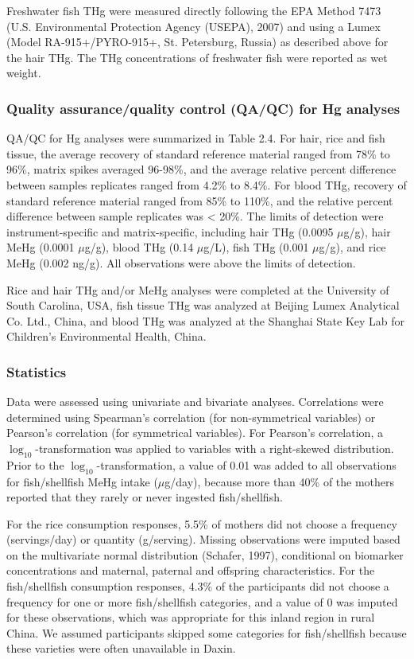 Freshwater fish THg were measured directly following the EPA Method 7473 (U.S. Environmental Protection Agency (USEPA), 2007) and using a Lumex (Model RA-915+/PYRO-915+, St. Petersburg, Russia) as described above for the hair THg. The THg concentrations of freshwater fish were reported as wet weight. 

\subsubsection{Quality assurance/quality control (QA/QC) for Hg analyses}

QA/QC for Hg analyses were summarized in Table 2.4. For hair, rice and fish tissue, the average recovery of standard reference material ranged from 78\% to 96\%, matrix spikes averaged 96-98\%, and the average relative percent difference between samples replicates ranged from 4.2\% to 8.4\%. For blood THg, recovery of standard reference material ranged from 85\% to 110\%, and the relative percent difference between sample replicates was < 20\%. The limits of detection were instrument-specific and matrix-specific, including hair THg (0.0095 \({\mu}\)g/g), hair MeHg (0.0001 \({\mu}\)g/g), blood THg (0.14 \({\mu}\)g/L), fish THg (0.001 \({\mu}\)g/g), and rice MeHg (0.002 ng/g). All observations were above the limits of detection.

Rice and hair THg and/or MeHg analyses were completed at the University of South Carolina, USA, fish tissue THg was analyzed at Beijing Lumex Analytical Co. Ltd., China, and blood THg was analyzed at the Shanghai State Key Lab for Children's Environmental Health, China.

\subsubsection{Statistics}

Data were assessed using univariate and bivariate analyses. Correlations were determined using Spearman's correlation (for non-symmetrical variables) or Pearson's correlation (for symmetrical variables). For Pearson's correlation, a $\log_{10}$-transformation was applied to variables with a right-skewed distribution. Prior to the $\log_{10}$-transformation, a value of 0.01 was added to all observations for fish/shellfish MeHg intake (\({\mu}\)g/day), because more than 40\% of the mothers reported that they rarely or never ingested fish/shellfish. 

For the rice consumption responses, 5.5\% of mothers did not choose a frequency (servings/day) or quantity (g/serving). Missing observations were imputed based on the multivariate normal distribution (Schafer, 1997), conditional on biomarker concentrations and maternal, paternal and offspring characteristics. For the fish/shellfish consumption responses, 4.3\% of the participants did not choose a frequency for one or more fish/shellfish categories, and a value of 0 was imputed for these observations, which was appropriate for this inland region in rural China. We assumed participants skipped some categories for fish/shellfish because these varieties were often unavailable in Daxin. 

